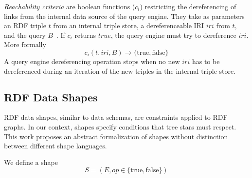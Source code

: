 \emph{Reachability criteria} are boolean functions ($c_i$) restricting the dereferencing of links from the internal data source of the query engine.
They take as parameters an RDF triple $t$ from an internal triple store, a dereferenceable IRI $iri$ from $t$, and the query $B$~\cite{Hartig2012}.
If $c_i$ returns $true$, the query engine must try to dereference $iri$.
More formally
\begin{equation}\label{eq:reachabilityCriteria}
c_i(t, iri, B) \rightarrow \{\mathrm{true}, \mathrm{false}\}
\end{equation}
A query engine dereferencing operation stops when no new $iri$ has to be dereferenced during an iteration of the new triples in the internal triple store.

\subsection{RDF Data Shapes}\label{sec:shape}
RDF data shapes, similar to data schemas, are constraints applied to RDF graphs.
In our context, shapes specify conditions that tree stars must respect.
This work proposes an abstract formalization of shapes without distinction between different shape languages.

We define a shape
\begin{equation}
S = (E, op \in \{\mathrm{true},\mathrm{false}\})
\end{equation}

